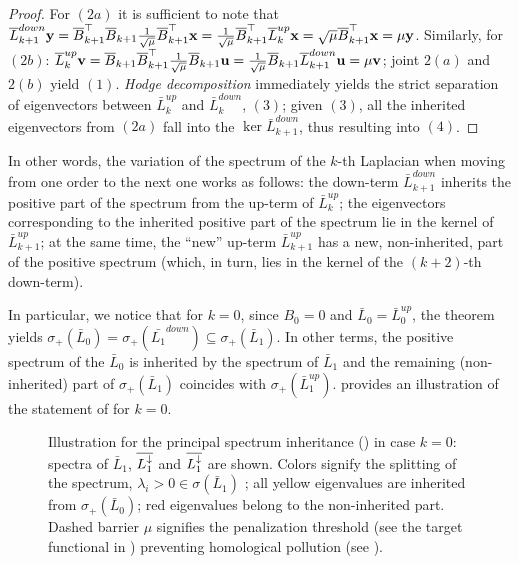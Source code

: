 \begin{proof}
For $(2a)$ it is sufficient to note that $ \overline{L}_{k+1}^{down} \mathbf{y} = \overline{B}_{k+1}^\top \overline{B}_{k+1} \frac{1}{\sqrt{\mu}} \overline{B}_{k+1}^\top \mathbf{x} = \frac{1}{\sqrt{\mu}}\overline{B}_{k+1}^\top \overline{L}_k^{up} \mathbf{x} = \sqrt \mu \overline{B}_{k+1}^\top \mathbf{x}  = \mu \mathbf{y}$. Similarly, for $(2b)$: $\overline{L}_k^{up} \mathbf{v}= \overline{B}_{k+1} \overline{B}_{k+1}^\top \frac{1}{\sqrt{\mu}} \overline{B}_{k+1} \mathbf{u} = \frac{1}{\sqrt{\mu}} \overline{B}_{k+1} \overline{L}_{k+1}^{down} \mathbf{u} = \mu \mathbf{v} $; joint $2(a)$ and $2(b)$ yield $(1)$. \emph{Hodge decomposition} immediately yields the strict separation of eigenvectors between $\bar L_k^{up}$ and $\bar L_k^{down}$, $(3)$; given $(3)$, all the inherited  eigenvectors from $(2a)$ fall into the $\ker \bar L_{k+1}^{down}$, thus resulting into $(4)$.
\end{proof}
In other words, the variation of the spectrum of the $k$-th Laplacian when moving from one order to the next one works as follows: 
the down-term $\bar L_{k+1}^{down}$ inherits the positive part of the spectrum from the up-term of  $\bar L_k^{up}$; the  eigenvectors corresponding to the inherited positive part of the spectrum lie in the kernel of $\bar L_{k+1}^{up}$; at the same time, the ``new'' up-term $\bar L_{k+1}^{up}$ has a new, non-inherited, part of the positive spectrum (which, in turn, lies in the kernel of the $(k+2)$-th down-term).

In particular, we notice that for $k = 0$, since $B_0=0$ and $\bar L_0=\bar L_0^{up}$, the  theorem yields $\sigma_+ (\bar L_0 ) = \sigma_+ (\bar{L_1}^{down}) \subseteq \sigma_+(\bar L_1)$. In other terms, the positive spectrum of the $\bar L_0$ is inherited by the spectrum of $\bar L_1$ and the remaining (non-inherited) part of $\sigma_+(\bar L_1)$ coincides with $\sigma_+(\bar L_1^{up})$. 
 provides an  illustration of the statement of   for $k = 0$.
  \begin{figure}[t]
    \centering
    
    \caption{Illustration for the principal spectrum inheritance () in case $k=0$: spectra of $\bar L_1$, $\overline{L_{1}^{\downarrow}}$ and $\overline{L_{1}^{\downarrow}}$ are shown. Colors signify the splitting of the spectrum, $\lambda_i>0 \in \sigma(\bar L_1)$ ; all yellow eigenvalues are inherited from $\sigma_+(\bar L_0)$; red eigenvalues belong to the non-inherited part. Dashed barrier $\mu$ signifies the penalization threshold (see the target functional in ) preventing homological pollution (see ). }
    \label{fig:thm_spct_ill}
    \vspace{-10pt}
  \end{figure}

























